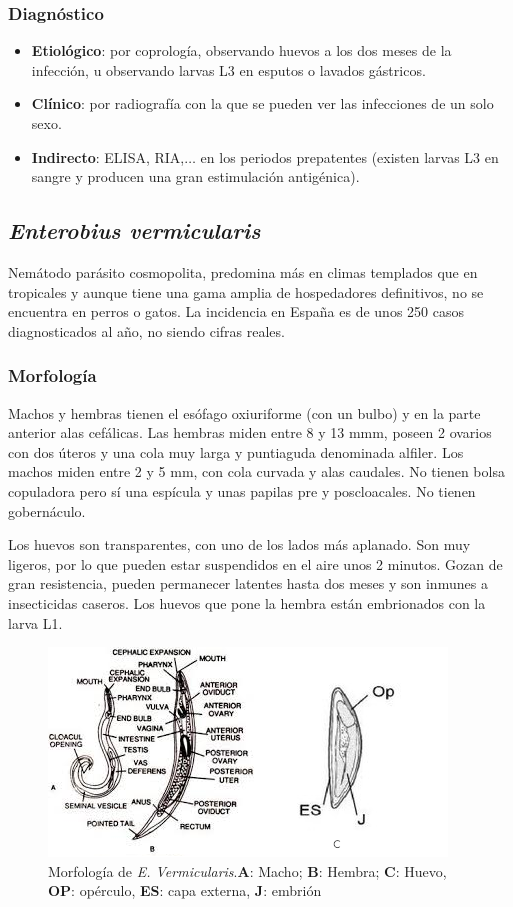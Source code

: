 \subsubsection{Diagnóstico}
\begin{itemize}[itemsep=0pt,parsep=0pt,topsep=0pt,partopsep=0pt]
	\item\textbf{Etiológico}: por coprología, observando huevos a los dos meses de la infección, u observando larvas L3 en esputos o lavados gástricos.
	\item \textbf{Clínico}: por radiografía con la que se pueden ver las infecciones de un solo sexo.
	\item \textbf{Indirecto}: ELISA, RIA,$\dots$ en los periodos prepatentes (existen larvas L3 en sangre y producen una gran estimulación antigénica).
\end{itemize}
\newpage
\subsection{\textit{Enterobius vermicularis}}
Nemátodo parásito cosmopolita, predomina más en climas templados que en tropicales y aunque tiene una gama amplia de hospedadores definitivos, no se encuentra en perros o gatos. La incidencia en España es de unos 250 casos diagnosticados al año, no siendo cifras reales.
\subsubsection{Morfología}
Machos y hembras tienen el esófago oxiuriforme (con un bulbo) y en la parte anterior alas cefálicas. Las hembras miden entre 8 y 13 mmm, poseen 2 ovarios con dos úteros y una cola muy larga y puntiaguda denominada alfiler. Los machos miden entre 2 y 5 mm, con cola curvada y alas caudales. No tienen bolsa copuladora pero sí una espícula y unas papilas pre y poscloacales. No tienen gobernáculo.

Los huevos son transparentes, con uno de los lados más aplanado. Son muy ligeros, por lo que pueden estar suspendidos en el aire unos 2 minutos. Gozan de gran resistencia, pueden permanecer latentes hasta dos meses y son inmunes a insecticidas caseros. Los huevos que pone la hembra están embrionados con la larva L1.
\begin{figure}[H]
	\centering
	\includegraphics[width=0.8\columnwidth]{A.imagenes/ACV-BioSan-Parasit-EVermicularisMorf}
	\caption[Morfología de \textit{E. Vermicularis}]{Morfología de \textit{E. Vermicularis}.\textbf{A}: Macho; \textbf{B}: Hembra; \textbf{C}: Huevo, \textbf{OP}: opérculo, \textbf{ES}: capa externa, \textbf{J}: embrión \label{fig:PARASIT:EVermicularisMorf}}
\end{figure}
\vspace*{-1cm}
